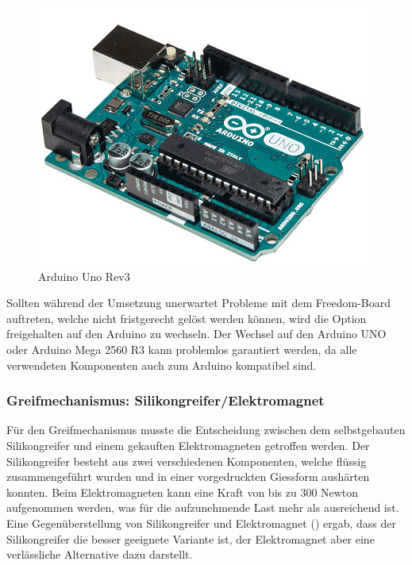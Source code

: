 \begin{figure}
    \centering
    \includegraphics[width=0.5\linewidth]{pics/arduino.jpg}
    \caption{Arduino Uno Rev3}
    \label{fig:arduino}
\end{figure}

Sollten während der Umsetzung unerwartet Probleme mit dem Freedom-Board auftreten, welche nicht fristgerecht gelöst werden können, wird die Option freigehalten auf den Arduino zu wechseln. Der Wechsel auf den Arduino UNO oder Arduino Mega 2560 R3 kann problemlos garantiert werden, da alle verwendeten Komponenten auch zum Arduino kompatibel sind.

\subsubsection{Greifmechanismus: Silikongreifer/Elektromagnet}

Für den Greifmechanismus musste die Entscheidung zwischen dem selbstgebauten Silikongreifer und einem gekauften Elektromagneten getroffen werden. Der Silikongreifer besteht aus zwei verschiedenen Komponenten, welche flüssig zusammengeführt wurden und in einer vorgedruckten Giessform aushärten konnten. Beim Elektromagneten kann eine Kraft von bis zu 300 Newton aufgenommen werden, was für die aufzunehmende Last mehr als ausreichend ist. Eine Gegenüberstellung von Silikongreifer und Elektromagnet () ergab, dass der Silikongreifer die besser geeignete Variante ist, der Elektromagnet aber eine verlässliche Alternative dazu darstellt.

